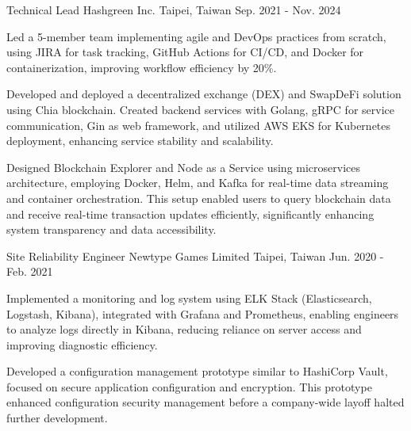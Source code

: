 \begin{cventries}
\cventry
{Technical Lead} %
{Hashgreen Inc.} %
{Taipei, Taiwan} %
{Sep. 2021 - Nov. 2024} %
{
  \begin{cvitems} %
    \item {Led a 5-member team implementing agile and DevOps practices from scratch, using JIRA for task tracking, GitHub Actions for CI/CD, and Docker for containerization, improving workflow efficiency by 20\%.}
    \item {Developed and deployed a decentralized exchange (DEX) and SwapDeFi solution using Chia blockchain. Created backend services with Golang, gRPC for service communication, Gin as web framework, and utilized AWS EKS for Kubernetes deployment, enhancing service stability and scalability.}
    \item {Designed Blockchain Explorer and Node as a Service using microservices architecture, employing Docker, Helm, and Kafka for real-time data streaming and container orchestration. This setup enabled users to query blockchain data and receive real-time transaction updates efficiently, significantly enhancing system transparency and data accessibility.}
  \end{cvitems}
}

\cventry
{Site Reliability Engineer} %
{Newtype Games Limited} %
{Taipei, Taiwan} %
{Jun. 2020 - Feb. 2021} %
{
  \begin{cvitems} %
    \item {Implemented a monitoring and log system using ELK Stack (Elasticsearch, Logstash, Kibana), integrated with Grafana and Prometheus, enabling engineers to analyze logs directly in Kibana, reducing reliance on server access and improving diagnostic efficiency.}
    \item {Developed a configuration management prototype similar to HashiCorp Vault, focused on secure application configuration and encryption. This prototype enhanced configuration security management before a company-wide layoff halted further development.}
  \end{cvitems}
}


\end{cventries}
